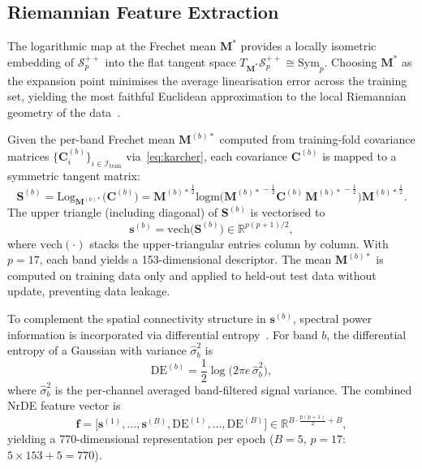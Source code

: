 \subsection{Riemannian Feature Extraction}
\label{sec:features}

The logarithmic map at the Frechet mean $\mathbf{M}^*$ provides a locally
isometric embedding of $\mathcal{S}^{++}_p$ into the flat tangent space
$T_{\mathbf{M}^*}\mathcal{S}^{++}_p \cong \mathrm{Sym}_p$.
Choosing $\mathbf{M}^*$ as the expansion point minimises the average
linearisation error across the training set, yielding the most faithful
Euclidean approximation to the local Riemannian geometry of the
data~\cite{arsigny2006logeuclidean,bleuz2022tangent}.

Given the per-band Frechet mean $\mathbf{M}^{(b)*}$ computed from
training-fold covariance matrices $\{\mathbf{C}^{(b)}_i\}_{i\in\mathcal{I}_\mathrm{train}}$
via~\eqref{eq:karcher}, each covariance $\mathbf{C}^{(b)}$ is mapped to a
symmetric tangent matrix:
\begin{equation}
  \mathbf{S}^{(b)} = \mathrm{Log}_{\mathbf{M}^{(b)*}}\!\bigl(\mathbf{C}^{(b)}\bigr)
    = {\mathbf{M}^{(b)*}}^{\!\frac{1}{2}}
        \mathrm{logm}\!\bigl({\mathbf{M}^{(b)*}}^{\!-\frac{1}{2}}
          \mathbf{C}^{(b)}\,{\mathbf{M}^{(b)*}}^{\!-\frac{1}{2}}\bigr)
      {\mathbf{M}^{(b)*}}^{\!\frac{1}{2}}.
  \label{eq:tangent_proj}
\end{equation}
The upper triangle (including diagonal) of $\mathbf{S}^{(b)}$ is vectorised to
\begin{equation}
  \mathbf{s}^{(b)} = \mathrm{vech}\!\bigl(\mathbf{S}^{(b)}\bigr)
    \in \mathbb{R}^{p(p+1)/2},
  \label{eq:vech}
\end{equation}
where $\mathrm{vech}(\cdot)$ stacks the upper-triangular entries column by column.
With $p=17$, each band yields a 153-dimensional descriptor.
The mean $\mathbf{M}^{(b)*}$ is computed on training data only and applied to
held-out test data without update, preventing data leakage.

To complement the spatial connectivity structure in $\mathbf{s}^{(b)}$, spectral
power information is incorporated via differential
entropy~\cite{duan2013differential}.
For band $b$, the differential entropy of a Gaussian with variance
$\hat{\sigma}_b^2$ is
\begin{equation}
  \mathrm{DE}^{(b)} = \frac{1}{2}\log\!\bigl(2\pi e\,\hat{\sigma}_b^2\bigr),
  \label{eq:de}
\end{equation}
where $\hat{\sigma}_b^2$ is the per-channel averaged band-filtered signal
variance.
The combined NrDE feature vector is
\begin{equation}
  \mathbf{f} = \bigl[\mathbf{s}^{(1)},\ldots,\mathbf{s}^{(B)},
    \mathrm{DE}^{(1)},\ldots,\mathrm{DE}^{(B)}\bigr]
    \in \mathbb{R}^{B\cdot\frac{p(p+1)}{2} + B},
  \label{eq:nrde_feat}
\end{equation}
yielding a 770-dimensional representation per epoch ($B=5$, $p=17$:
$5\!\times\!153\!+\!5\!=\!770$).

